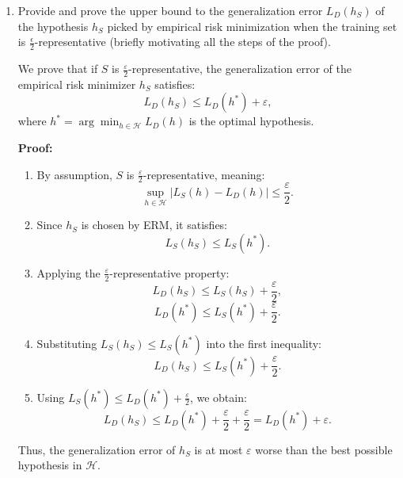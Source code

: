 \documentclass[a4paper,11pt,oneside]{book}
\begin{document}
\begin{enumerate}
        \item Provide and prove the upper bound to the generalization error $L_D(h_S)$ of the hypothesis $h_S$ picked by empirical risk minimization when the training set is $\frac{\epsilon}{2}$-representative (briefly motivating all the steps of the proof).
            \begin{solution}
                We prove that if $S$ is $\frac{\varepsilon}{2}$-representative, the generalization error of the empirical risk minimizer $h_S$ satisfies:
                \[
                L_D(h_S) \leq L_D(h^*) + \varepsilon,
                \]
                where $h^* = \arg\min_{h \in \mathcal{H}} L_D(h)$ is the optimal hypothesis.
                
                \textbf{Proof:}
                \begin{enumerate}
                    \item By assumption, $S$ is $\frac{\varepsilon}{2}$-representative, meaning:
                    \[
                    \sup_{h \in \mathcal{H}} |L_S(h) - L_D(h)| \leq \frac{\varepsilon}{2}.
                    \]
                    \item Since $h_S$ is chosen by ERM, it satisfies:
                    \[
                    L_S(h_S) \leq L_S(h^*).
                    \]
                    \item Applying the $\frac{\varepsilon}{2}$-representative property:
                    \[
                    L_D(h_S) \leq L_S(h_S) + \frac{\varepsilon}{2},
                    \]
                    \[
                    L_D(h^*) \leq L_S(h^*) + \frac{\varepsilon}{2}.
                    \]
                    \item Substituting $L_S(h_S) \leq L_S(h^*)$ into the first inequality:
                    \[
                    L_D(h_S) \leq L_S(h^*) + \frac{\varepsilon}{2}.
                    \]
                    \item Using $L_S(h^*) \leq L_D(h^*) + \frac{\varepsilon}{2}$, we obtain:
                    \[
                    L_D(h_S) \leq L_D(h^*) + \frac{\varepsilon}{2} + \frac{\varepsilon}{2} = L_D(h^*) + \varepsilon.
                    \]
                \end{enumerate}
                Thus, the generalization error of $h_S$ is at most $\varepsilon$ worse than the best possible hypothesis in $\mathcal{H}$.
            \end{solution}    
    \end{enumerate}
\end{document}
